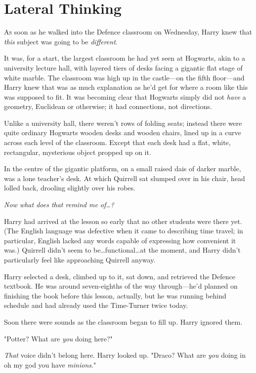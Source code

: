 \chapter{Lateral Thinking}

\lettrine{A}{s} soon as he walked into the Defence classroom on Wednesday, Harry knew that
\emph{this} subject was going to be \emph{different}.

It was, for a start, the largest classroom he had yet seen at Hogwarts, akin to
a university lecture hall, with layered tiers of desks facing a gigantic
flat stage of white marble. The classroom was high up in the castle—on the
fifth floor—and Harry knew that was as much explanation as he’d get for where
a room like this was supposed to fit. It was becoming clear that Hogwarts
simply did not \emph{have} a geometry, Euclidean or otherwise; it had
connections, not directions.

Unlike a university hall, there weren’t rows of folding seats; instead there
were quite ordinary Hogwarts wooden desks and wooden chairs, lined up in a
curve across each level of the classroom. Except that each desk had a flat,
white, rectangular, mysterious object propped up on it.

In the centre of the gigantic platform, on a small raised dais of darker
marble, was a lone teacher’s desk. At which Quirrell sat slumped over in his
chair, head lolled back, drooling slightly over his robes.

\emph{Now what does that remind me of…?}

Harry had arrived at the lesson so early that no other students were there yet.
(The English language was defective when it came to describing time travel; in
particular, English lacked any words capable of expressing how convenient it
was.) Quirrell didn’t seem to be…functional…at the moment, and
Harry didn’t particularly feel like approaching Quirrell anyway.

Harry selected a desk, climbed up to it, sat down, and retrieved the Defence
textbook. He was around seven-eighths of the way through—he’d planned on
finishing the book before this lesson, actually, but he was running behind
schedule and had already used the Time-Turner twice today.

Soon there were sounds as the classroom began to fill up. Harry ignored them.

"Potter? What are \emph{you} doing here?"

\emph{That} voice didn’t belong here. Harry looked up. "Draco? What are
\emph{you} doing in oh my god you have \emph{minions}."

